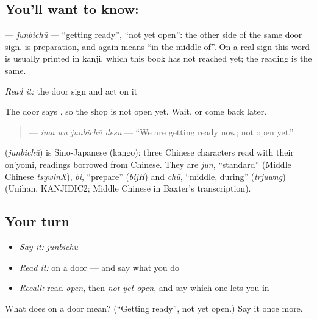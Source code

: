 \subsection*{You'll want to know: }
\textbf{} — \emph{junbichū} — \textquotedblleft{}getting ready\textquotedblright{}, \textquotedblleft{}not yet open\textquotedblright{}: the other side of the same door sign. \textbf{} is preparation, and \textbf{} again means \textquotedblleft{}in the middle of\textquotedblright{}. On a real sign this word is usually printed in kanji, which this book has not reached yet; the reading is the same.

\emph{Read it:} the door sign and act on it

The door says \textbf{}, so the shop is not open yet. Wait, or come back later.

\begin{quote}
\textbf{ } — \emph{ima wa junbichū desu} — \textquotedblleft{}We are getting ready now; not open yet.\textquotedblright{}
\end{quote}

\begin{cousinweb}
\textbf{} (\emph{junbichū}) is Sino-Japanese (kango): three Chinese characters read with their on'yomi, readings borrowed from Chinese. They are \emph{jun}, \textquotedblleft{}standard\textquotedblright{} (Middle Chinese \emph{tsywinX}), \emph{bi}, \textquotedblleft{}prepare\textquotedblright{} (\emph{bijH}) and \emph{chū}, \textquotedblleft{}middle, during\textquotedblright{} (\emph{trjuwng}) (Unihan, KANJIDIC2; Middle Chinese in Baxter's transcription).
\end{cousinweb}

\subsection*{Your turn}
\begin{itemize}
\raggedright
  \item \emph{Say it:} \emph{junbichū}
  \item \emph{Read it:} \textbf{} on a door — and say what you do
  \item \emph{Recall:} read \emph{open}, then \emph{not yet open}, and say which one lets you in
\end{itemize}

\begin{tcolorbox}[breakable,colback=teal!4,colframe=teal!35!black,title={Before you move on}]
What does  on a door mean? (\textquotedblleft{}Getting ready\textquotedblright{}, not yet open.) Say it once more.
\end{tcolorbox}
